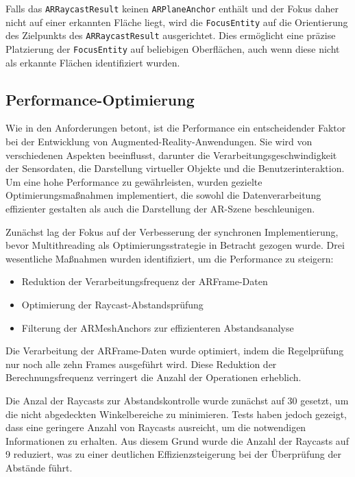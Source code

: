 Falls das \texttt{ARRaycastResult} keinen \texttt{ARPlaneAnchor} enthält und der Fokus daher nicht auf einer erkannten Fläche liegt, wird die \texttt{FocusEntity} auf die Orientierung des Zielpunkts des \texttt{ARRaycastResult} ausgerichtet. Dies ermöglicht eine präzise Platzierung der \texttt{FocusEntity} auf beliebigen Oberflächen, auch wenn diese nicht als erkannte Flächen identifiziert wurden.

\subsection{Performance-Optimierung}

Wie in den Anforderungen betont, ist die Performance ein entscheidender Faktor bei der Entwicklung von Augmented-Reality-Anwendungen. Sie wird von verschiedenen Aspekten beeinflusst, darunter die Verarbeitungsgeschwindigkeit der Sensordaten, die Darstellung virtueller Objekte und die Benutzerinteraktion. Um eine hohe Performance zu gewährleisten, wurden gezielte Optimierungsmaßnahmen implementiert, die sowohl die Datenverarbeitung effizienter gestalten als auch die Darstellung der AR-Szene beschleunigen.

Zunächst lag der Fokus auf der Verbesserung der synchronen Implementierung, bevor Multithreading als Optimierungsstrategie in Betracht gezogen wurde. Drei wesentliche Maßnahmen wurden identifiziert, um die Performance zu steigern:

\begin{itemize}
\item Reduktion der Verarbeitungsfrequenz der ARFrame-Daten
\item Optimierung der Raycast-Abstandsprüfung
\item Filterung der ARMeshAnchors zur effizienteren Abstandsanalyse
\end{itemize}

Die Verarbeitung der ARFrame-Daten wurde optimiert, indem die Regelprüfung nur noch alle zehn Frames ausgeführt wird. Diese Reduktion der Berechnungsfrequenz verringert die Anzahl der Operationen erheblich.

Die Anzal der Raycasts zur Abstandskontrolle wurde zunächst auf 30 gesetzt, um die nicht abgedeckten Winkelbereiche zu minimieren. Tests haben jedoch gezeigt, dass eine geringere Anzahl von Raycasts ausreicht, um die notwendigen Informationen zu erhalten. Aus diesem Grund wurde die Anzahl der Raycasts auf 9 reduziert, was zu einer deutlichen Effizienzsteigerung bei der Überprüfung der Abstände führt.

